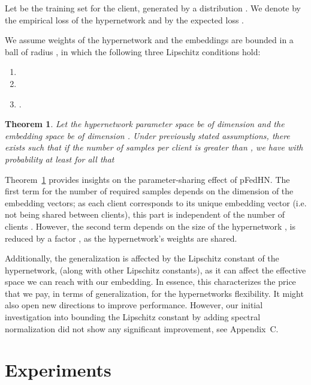 \documentclass{article}
\newtheorem{theorem}{Theorem}
\newcommand\ourmethod{pFedHN}
\begin{document}
Let  be the training set for the  client, generated by a distribution . We denote by  the empirical loss of the hypernetwork  and by  the expected loss  . 

We assume weights of the hypernetwork and the embeddings are bounded in a ball of radius , in which the following three Lipschitz conditions hold:
\begin{enumerate}
    \item 
    \item 
    \item . \quad
\end{enumerate}

\begin{theorem}\label{theory_gen}
 Let the hypernetwork parameter space be of dimension  and the embedding space be of dimension . Under previously stated assumptions, there exists  such that if the number of samples per client  is greater than , we have with probability at least  for all  that 
\end{theorem}


Theorem~\ref{theory_gen} provides insights on the parameter-sharing effect of \ourmethod{}. The first term for the number of required samples  depends on the dimension of the embedding vectors; as each client corresponds to its unique embedding vector (i.e. not being shared between clients), this part is independent of the number of clients . 
However, the second term depends on the size of the hypernetwork , is reduced by a factor , as the hypernetwork's weights are shared.



Additionally, the generalization is affected by the Lipschitz constant of the hypernetwork,  (along with other Lipschitz constants), as it can affect the effective space we can reach with our embedding. In essence, this characterizes the price that we pay, in terms of generalization, for the hypernetworks flexibility. It might also open new directions to improve performance. However, our initial investigation into bounding the Lipschitz constant by adding spectral normalization \cite{spectral_normalization} did not show any significant improvement, see Appendix~C.





\section{Experiments}\label{sec:experiments}
\end{document}
